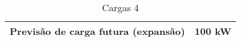 \begin{table}[H]
\centering
\caption{Cargas 4}
\label{table:4}
\begin{tabular}{|c|c|}
\hline
Previsão de carga futura (expansão) & 100 kW \\ \hline
\end{tabular}
\end{table}